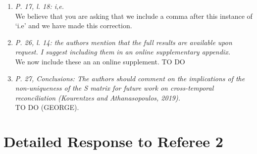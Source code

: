 \documentclass[a4paper,11pt]{article}
\begin{document}
\begin{enumerate}
	    \item \textit{P. 17, l. 18: i,e.}\\
	    We believe that you are asking that we include a comma after this instance of `i.e' and we have made this correction.\\
	    
	    \item \textit{P. 26, l. 14: the authors mention that the full results are available upon request. I suggest including them in an online supplementary appendix.}\\
	    We now include these an an online supplement. TO DO\\
	    
	    \item \textit{P. 27, Conclusions: The authors should comment on the implications of the non-uniqueness of the S matrix for future work on cross-temporal reconciliation (Kourentzes and Athanasopoulos, 2019).}\\
	    TO DO (GEORGE).\\
	    
    \end{enumerate}

    \section*{Detailed Response to Referee 2}
\end{document}
